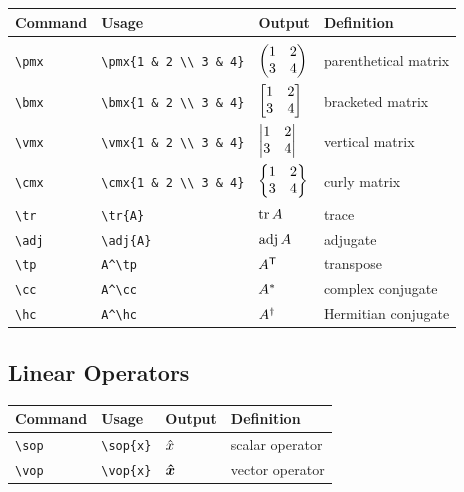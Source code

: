 \documentclass[11pt]{article}
\begin{document}
\begin{tabular}{llll}
    Command     & Usage                            & Output                      & Definition           \\
    \hline                                                                                              \\ [-3ex]
    \verb|\pmx| & \verb|\pmx{1 & 2 \\ 3 & 4}|      & $\begin{pmatrix} 1 & 2 \\ 3 & 4 \end{pmatrix}$      & parenthetical matrix \\ [3ex]
    \verb|\bmx| & \verb|\bmx{1 & 2 \\ 3 & 4}|      & $\begin{bmatrix} 1 & 2 \\ 3 & 4 \end{bmatrix}$      & bracketed matrix     \\ [3ex]
    \verb|\vmx| & \verb|\vmx{1 & 2 \\ 3 & 4}|      & $\begin{vmatrix} 1 & 2 \\ 3 & 4 \end{vmatrix}$      & vertical matrix      \\ [3ex]
    \verb|\cmx| & \verb|\cmx{1 & 2 \\ 3 & 4}|      & $\begin{Bmatrix} 1 & 2 \\ 3 & 4 \end{Bmatrix}$      & curly matrix         \\ [3ex]
    \verb|\tr|  & \verb|\tr{A}|                    & $\operatorname{tr}{A}$                    & trace                \\
    \verb|\adj| & \verb|\adj{A}|                   & $\operatorname{adj}{A}$                   & adjugate             \\
    \verb|\tp|  & \verb|A^\tp|                     & $A^{\mathsf{T}}$                     & transpose            \\
    \verb|\cc|  & \verb|A^\cc|                     & $A^*$                     & complex conjugate    \\
    \verb|\hc|  & \verb|A^\hc|                     & $A^\dag$                     & Hermitian conjugate  \\
\end{tabular}

\subsection{Linear Operators}

\begin{tabular}{llll}
    Command     & Usage          & Output    & Definition      \\
    \hline
    \verb|\sop| & \verb|\sop{x}| & $\hat{x}$ & scalar operator \\
    \verb|\vop| & \verb|\vop{x}| & $\bm{\hat{x}}$ & vector operator \\
\end{tabular}
\end{document}
